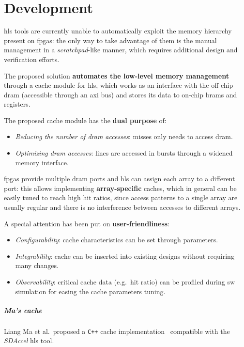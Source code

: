 \documentclass[11pt,a4paper,oneside]{memoir}
\begin{document}
\chapter{Development}
\ac{hls} tools are currently unable to automatically exploit the memory
hierarchy present on \acp{fpga}: the only way to take advantage of
them is the manual management in a \emph{scratchpad}-like manner, which
requires additional design and verification efforts.

The proposed solution \textbf{automates the low-level memory management}
through a cache module for \ac{hls}, which works as an interface with the
off-chip \ac{dram} (accessible through an \ac{axi} bus) and stores its data to
on-chip \acp{bram} and registers.

\bigskip
The proposed cache module has the \textbf{dual purpose} of:
\begin{itemize}
	\item \emph{Reducing the number of \ac{dram} accesses}: misses only
		needs to access \ac{dram}.
	\item \emph{Optimizing \ac{dram} accesses}: lines are accessed in
		bursts through a widened memory interface.
\end{itemize}

\acp{fpga} provide multiple \ac{dram} ports and \ac{hls} can assign each array
to a different port: this allows implementing \textbf{array-specific} caches,
which in general can be easily tuned to reach high hit ratios, since access
patterns to a single array are usually regular and there is no interference
between accesses to different arrays.

\bigskip
A special attention has been put on \textbf{user-friendliness}:
\begin{itemize}
	\item \emph{Configurability}: cache characteristics can be set through
		parameters.
	\item \emph{Integrability}: cache can be inserted into existing designs
		without requiring many changes.
	\item \emph{Observability}: critical cache data (e.g.\ hit ratio) can
		be profiled during \ac{sw} simulation for easing the cache
		parameters tuning.
\end{itemize}

\paragraph{Ma's cache}
Liang Ma et al.\ proposed a \texttt{C++} cache implementation~\cite{liang}
compatible with the \emph{SDAccel\texttrademark} \ac{hls} tool.
\end{document}
